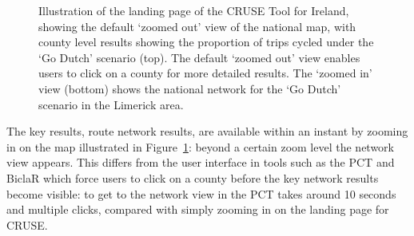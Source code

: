 \documentclass[
  super,
  preprint,
  3p]{elsarticle}
\begin{document}
\begin{figure}


\caption{\label{fig-landing}Illustration of the landing page of the
CRUSE Tool for Ireland, showing the default `zoomed out' view of the
national map, with county level results showing the proportion of trips
cycled under the `Go Dutch' scenario (top). The default `zoomed out'
view enables users to click on a county for more detailed results. The
`zoomed in' view (bottom) shows the national network for the `Go Dutch'
scenario in the Limerick area.}

\end{figure}%

The key results, route network results, are available within an instant
by zooming in on the map illustrated in Figure~\ref{fig-landing}: beyond
a certain zoom level the network view appears. This differs from the
user interface in tools such as the PCT and BiclaR which force users to
click on a county before the key network results become visible: to get
to the network view in the PCT takes around 10 seconds and multiple
clicks, compared with simply zooming in on the landing page for CRUSE.
\end{document}
